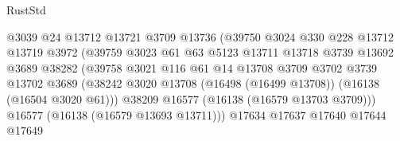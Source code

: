 \begin{lexlean}{RustStd}
\begin{coremodule}
                                        @3039
                                        @24
                                        @13712
                                        @13721
                                        @3709
                                        @13736
                                        (@39750
                                          @3024
                                          @330
                                          @228
                                          @13712
                                          @13719
                                          @3972
                                          (@39759
                                            @3023
                                            @61
                                            @63
                                            @5123
                                            @13711
                                            @13718
                                            @3739
                                            @13692
                                            @3689
                                            @38282
                                            (@39758
                                              @3021
                                              @116
                                              @61
                                              @14
                                              @13708
                                              @3709
                                              @3702
                                              @3739
                                              @13702
                                              @3689
                                              (@38242
                                                @3020
                                                @13708
                                                (@16498 (@16499 @13708))
                                                (@16138 (@16504 @3020 @61)))
                                              @38209
                                              @16577
                                              (@16138 (@16579 @13703 @3709)))
                                            @16577
                                            (@16138 (@16579 @13693 @13711)))
                                          @17634
                                          @17637
                                          @17640
                                          @17644
                                          @17649

\end{coremodule}
\end{lexlean}
